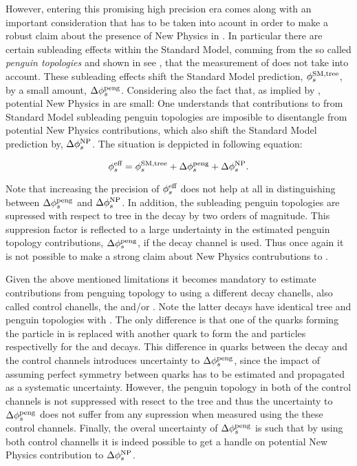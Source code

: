 However, entering this promising high precision era comes along with an important consideration
that has to be taken into acount in order to make a robust claim about the presence of New Physics
in \phis. In particular there are certain subleading effects within the Standard Model, comming from
the so called {\it penguin topologies} and shown in see , that the
\phis measurement of  does not take into account. These subleading effects shift
the Standard Model prediction, $\phi_{s}^{\tiny \text{SM,tree}}$, by a small amount, $\Delta\phi_{s}^{\tiny\text{peng}}$.
Considering also the fact that, as implied by , potential New Physics in
\phis are small: One understands that contributions to \phis from Standard Model subleading penguin
topologies are imposible to disentangle from potential New Physics contributions, which also shift
the Standard Model prediction by, $\Delta\phi_{s}^{\tiny \text{NP}}$. The situation is deppicted in
following equation:

\begin{equation}
\centering
 \phis^{\text {eff}} = \phis^{\tiny \text{SM,tree}} + \Delta\phiS{peng} + \Delta\phis^{\tiny \text{NP}}.
 \label{app_phis_sm_peng}
\end{equation}

\noindent Note that increasing the precision of $\phi_{s}^{\text {eff}}$ does not help at all in distinguishing
between $\Delta\phi_{s}^{\tiny\text{peng}}$ and $\Delta\phi_{s}^{\tiny \text{NP}}$. In addition, the subleading penguin
topologies are supressed with respect to tree in the \BsJpsiPhi decay by two orders of magnitude.
This suppresion factor is reflected to a large undertainty in the estimated penguin topology contributions,
$\Delta\phi_{s}^{\tiny\text{peng}}$, if the \BsJpsiPhi decay channel is used. Thus once again it is not possible to
make a strong claim about New Physics contrubutions to \phis.

Given the above mentioned limitations it becomes mandatory to estimate contributions from
penguing topology to \phis using a different decay chanells, also called control chanells,
\eg the \BsJpsiKst and/or \BdJpsiRho. Note the latter decays have identical tree and penguin
topologies with \BsJpsiPhi. The only difference is that one of the quarks forming the \Pphi
particle in  is replaced with another quark to form the \Kstarz
and \rhoz particles respectivelly for the \BsJpsiKst and \BdJpsiRho decays. This difference in
quarks between the \BsJpsiPhi decay and the control channels introduces uncertainty to
$\Delta\phi_{s}^{\tiny\text{peng}}$, since the impact of assuming perfect symmetry between quarks has to be
estimated and propagated as a systematic uncertainty. However, the penguin topology in both of
the control channels is not suppressed with resect to the tree and thus the uncertainty to
$\Delta\phi_{s}^{\tiny\text{peng}}$ does not suffer from any supression when measured using the
these control channels. Finally, the overal uncertainty of $\Delta\phi_{s}^{\tiny\text{peng}}$ is such
that by using both control channells it is indeed possible to get a handle on potential
New Physics contribution to $\Delta\phi_{s}^{\tiny \text{NP}}$.

